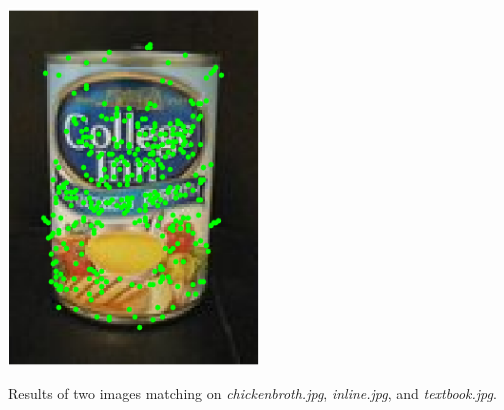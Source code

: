 \documentclass[12pt,letterpaper,boxed]{hmcpset}
\begin{document}
\begin{solution}
  \includegraphics[width=0.5\textwidth]{1_5.png}
\end{solution}
\newpage
\begin{problem}[2.4]
  Results of two images matching on \textit{chickenbroth.jpg}, \textit{inline.jpg}, and \textit{textbook.jpg}.
\end{problem}
\end{document}
